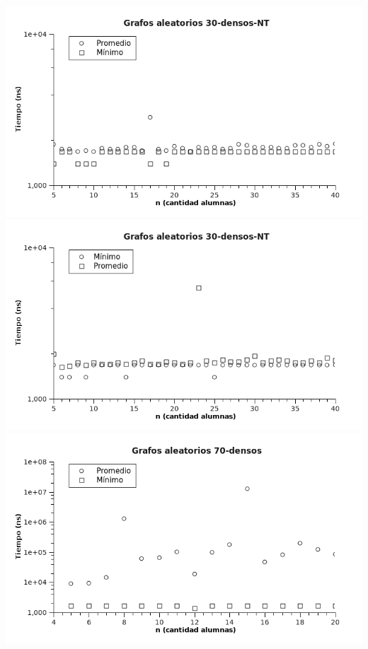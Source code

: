 \newline
\includegraphics[scale=0.8]{img/ej2/tests/30d_nt_lote1.png}
\newline
\includegraphics[scale=0.8]{img/ej2/tests/30d_nt_lote2.png}
\newline
\includegraphics[scale=0.8]{img/ej2/tests/70d_lote1.png}
\newline
